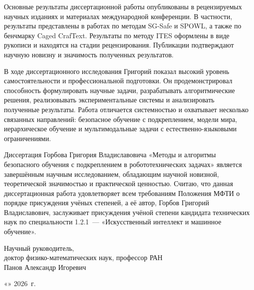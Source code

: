 \documentclass[a4paper,14pt]{extarticle}
\begin{document}
Основные результаты диссертационной работы опубликованы в рецензируемых научных изданиях и материалах международной конференции. В частности, результаты представлены в работах по методам SG-Safe и SPOWL, а также по бенчмарку Caged CrafText. Результаты по методу ITES оформлены в виде рукописи и находятся на стадии рецензирования. Публикации подтверждают научную новизну и значимость полученных результатов.

В ходе диссертационного исследования Григорий показал высокий уровень самостоятельности и профессиональной подготовки. Он продемонстрировал способность формулировать научные задачи, разрабатывать алгоритмические решения, реализовывать экспериментальные системы и анализировать полученные результаты. Работа отличается системностью и охватывает несколько связанных направлений: безопасное обучение с подкреплением, модели мира, иерархическое обучение и мультимодальные задачи с естественно-языковыми ограничениями.

Диссертация Горбова Григория Владиславовича «Методы и алгоритмы безопасного обучения с подкреплением в робототехнических задачах» является завершённым научным исследованием, обладающим научной новизной, теоретической значимостью и практической ценностью. Считаю, что данная диссертационная работа удовлетворяет всем требованиям Положения МФТИ о порядке присуждения учёных степеней, а её автор, Горбов Григорий Владиславович, заслуживает присуждения учёной степени кандидата технических наук по специальности 1.2.1~--- «Искусственный интеллект и машинное обучение».

\vspace{1\baselineskip}
\noindent Научный руководитель,\\
доктор физико-математических наук, профессор РАН\\
Панов Александр Игоревич

\vspace{2\baselineskip}
\noindent «\underline{\hspace{1cm}}» \underline{\hspace{3cm}} 2026~г.
\end{document}
